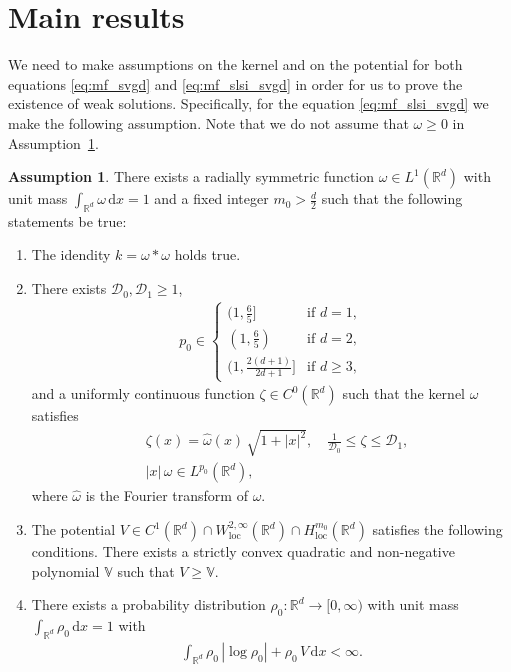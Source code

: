 \documentclass[reqno, 11pt]{amsart}
\numberwithin{equation}{section}
\theoremstyle{definition}
\newtheorem{Ass}[thm]{Assumption}
\begin{document}
    \section{Main results}\label{sect:main_res}
    
    We need to make assumptions on the kernel and on the potential for both equations \eqref{eq:mf_svgd} and \eqref{eq:mf_slsi_svgd} in order for us to prove the existence of weak solutions. Specifically, for the equation \eqref{eq:mf_slsi_svgd} we make the following assumption. Note that we do not assume that $\omega\geq 0$ in Assumption~\ref{assumptions:slsi}.
    
    \begin{Ass}
        \label{assumptions:slsi}
        There exists a radially symmetric function $\omega\in L^1(\mathbb{R}^{d})$ with unit mass $\int_{\mathbb{R}^{d}}\omega\,\mathrm{d} x=1$ and a fixed integer $m_0>\frac{d}{2}$ such that the following statements be true:
        \begin{enumerate}[label=(A\arabic*)]
            \item The idendity $k=\omega\ast\omega$ holds true.
            \item  \label{ass:four_mom}
            There exists $\mathcal{D}_0,\mathcal{D}_1\geq 1$, \begin{align*}
            p_0\in\begin{cases}
            (1,\frac{6}{5}]&\text{if }d=1,\\
            (1,\frac{6}{5})&\text{if }d=2,\\
            (1,\frac{2(d+1)}{2d+1}]&\text{if }d\geq 3,
        \end{cases}
    \end{align*}
    and a uniformly continuous function $\zeta\in C^0(\mathbb{R}^{d})$ such that the kernel $\omega$  satisfies
    \begin{align}
        \label{ass:fourier}
        &\zeta(x)=\hat{\omega}(x)\,\sqrt{1+|x|^2},\quad\frac{1}{\mathcal{D}_0}\leq \zeta\leq \mathcal{D}_1,\\
        \label{ass:moment}
        &|x|\,\omega\in  L^{p_0}(\mathbb{R}^{d}),
    \end{align}
    where $\hat{\omega}$ is the Fourier transform of $\omega$.
    \item\label{ass:quad}
    The potential $V\in C^1(\mathbb{R}^{d})\cap W_{\mathrm{loc}}^{2,\infty}(\mathbb{R}^{d})\cap H_{\mathrm{loc}}^{m_0}(\mathbb{R}^{d})$ satisfies the following conditions. There exists a strictly convex quadratic and non-negative polynomial $\mathbb{V}$ such that $V\geq \mathbb{V}$.
    \item\label{ass:init_slsi} There exists a probability distribution $\rho_0:\mathbb{R}^{d} \to [0,\infty)$ with unit mass $\int_{\mathbb{R}^{d}} \rho_0 \,\mathrm{d} x= 1$ with
    \begin{align*}
        \int_{\mathbb{R}^{d}} \rho_0\, |\log \rho_0| + \rho_0\, V \,\mathrm{d} x
        < \infty.
    \end{align*}
\end{enumerate}
\end{Ass}
\end{document}
